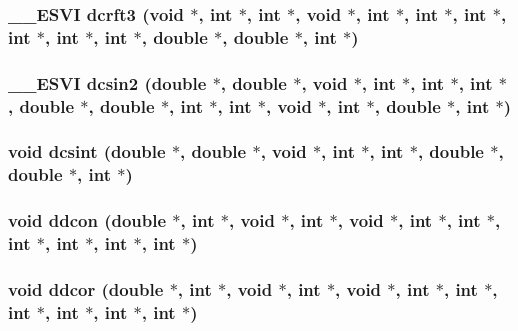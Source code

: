 \subsubsection{\setlength{\rightskip}{0pt plus 5cm}\_\-\_\-ESVI dcrft3 (void $\ast$, int $\ast$, int $\ast$, void $\ast$, int $\ast$, int $\ast$, int $\ast$, int $\ast$, int $\ast$, int $\ast$, double $\ast$, double $\ast$, int $\ast$)}\label{essl_8h_e5419bfd523530e60cc1dc39f92443a8}


\subsubsection{\setlength{\rightskip}{0pt plus 5cm}\_\-\_\-ESVI dcsin2 (double $\ast$, double $\ast$, void $\ast$, int $\ast$, int $\ast$, int $\ast$, double $\ast$, double $\ast$, int $\ast$, int $\ast$, void $\ast$, int $\ast$, double $\ast$, int $\ast$)}\label{essl_8h_9753e1f79b2c4fe54ca7a144306c1e19}


\subsubsection{\setlength{\rightskip}{0pt plus 5cm}void dcsint (double $\ast$, double $\ast$, void $\ast$, int $\ast$, int $\ast$, double $\ast$, double $\ast$, int $\ast$)}\label{essl_8h_839cc352a699dec307cdc245318a0354}


\subsubsection{\setlength{\rightskip}{0pt plus 5cm}void ddcon (double $\ast$, int $\ast$, void $\ast$, int $\ast$, void $\ast$, int $\ast$, int $\ast$, int $\ast$, int $\ast$, int $\ast$, int $\ast$)}\label{essl_8h_440a89ff9f4abda9e7ae1e7f0b0e0ce4}


\subsubsection{\setlength{\rightskip}{0pt plus 5cm}void ddcor (double $\ast$, int $\ast$, void $\ast$, int $\ast$, void $\ast$, int $\ast$, int $\ast$, int $\ast$, int $\ast$, int $\ast$, int $\ast$)}\label{essl_8h_f133212a63ce71317b2a21d8e572d8fa}


